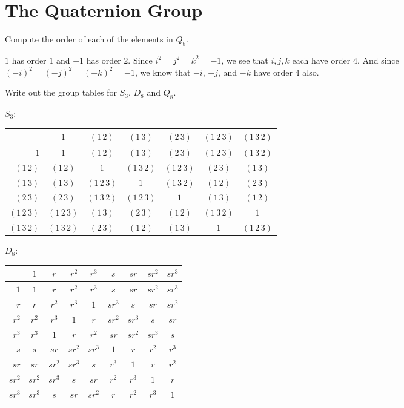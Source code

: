 \section{The Quaternion Group}

 Compute the order of each of the elements in $Q_8$.
\label{exercise:Q8-element-order}
\begin{solution}
  $1$ has order $1$ and $-1$ has order $2$. Since
  $i^2 = j^2 = k^2 = -1$, we see that $i,j,k$ each have order $4$. And
  since $(-i)^2 = (-j)^2 = (-k)^2 = -1$, we know that $-i$, $-j$, and
  $-k$ have order $4$ also.
\end{solution}

 Write out the group tables for $S_3$, $D_8$ and $Q_8$.
\begin{solution}
  $S_3$:
  \begin{center}
    \begin{tabular}{r|cccccc}
      & $1$ & $(1\,2)$ & $(1\,3)$ & $(2\,3)$ & $(1\,2\,3)$ & $(1\,3\,2)$ \\
      \hline
      $1$ & $1$ & $(1\,2)$ & $(1\,3)$ & $(2\,3)$ & $(1\,2\,3)$ & $(1\,3\,2)$ \\
      $(1\,2)$ & $(1\,2)$ & $1$ & $(1\,3\,2)$ & $(1\,2\,3)$ & $(2\,3)$
      & $(1\,3)$ \\
      $(1\,3)$ & $(1\,3)$ & $(1\,2\,3)$ & $1$ & $(1\,3\,2)$ & $(1\,2)$
      & $(2\,3)$ \\
      $(2\,3)$ & $(2\,3)$ & $(1\,3\,2)$ & $(1\,2\,3)$ & $1$ & $(1\,3)$
      & $(1\,2)$ \\
      $(1\,2\,3)$ & $(1\,2\,3)$ & $(1\,3)$ & $(2\,3)$ & $(1\,2)$
      & $(1\,3\,2)$ & $1$ \\
      $(1\,3\,2)$ & $(1\,3\,2)$ & $(2\,3)$ & $(1\,2)$ & $(1\,3)$ & $1$
                                                           & $(1\,2\,3)$
    \end{tabular}
  \end{center}

  $D_8$:
  \begin{center}
    \begin{tabular}{r|cccccccc}
      & $1$ & $r$ & $r^2$ & $r^3$ & $s$ & $sr$ & $sr^2$ & $sr^3$ \\
      \hline
      $1$ & $1$ & $r$ & $r^2$ & $r^3$ & $s$ & $sr$ & $sr^2$ & $sr^3$ \\
      $r$ & $r$ & $r^2$ & $r^3$ & $1$ & $sr^3$ & $s$ & $sr$ & $sr^2$ \\
      $r^2$ & $r^2$ & $r^3$ & $1$ & $r$ & $sr^2$ & $sr^3$ & $s$ & $sr$ \\
      $r^3$ & $r^3$ & $1$ & $r$ & $r^2$ & $sr$ & $sr^2$ & $sr^3$ & $s$ \\
      $s$ & $s$ & $sr$ & $sr^2$ & $sr^3$ & $1$ & $r$ & $r^2$ & $r^3$ \\
      $sr$ & $sr$ & $sr^2$ & $sr^3$ & $s$ & $r^3$ & $1$ & $r$ & $r^2$ \\
      $sr^2$ & $sr^2$ & $sr^3$ & $s$ & $sr$ & $r^2$ & $r^3$ & $1$ & $r$ \\
      $sr^3$ & $sr^3$ & $s$ & $sr$ & $sr^2$ & $r$ & $r^2$ & $r^3$ & $1$
    \end{tabular}
  \end{center}


\end{solution}
